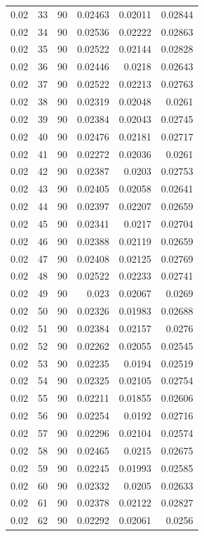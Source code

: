 \begin{tabular}{rrrrrr}
0.02 & 33 & 90 & 0.02463 & 0.02011 & 0.02844 \\
0.02 & 34 & 90 & 0.02536 & 0.02222 & 0.02863 \\
0.02 & 35 & 90 & 0.02522 & 0.02144 & 0.02828 \\
0.02 & 36 & 90 & 0.02446 & 0.0218 & 0.02643 \\
0.02 & 37 & 90 & 0.02522 & 0.02213 & 0.02763 \\
0.02 & 38 & 90 & 0.02319 & 0.02048 & 0.0261 \\
0.02 & 39 & 90 & 0.02384 & 0.02043 & 0.02745 \\
0.02 & 40 & 90 & 0.02476 & 0.02181 & 0.02717 \\
0.02 & 41 & 90 & 0.02272 & 0.02036 & 0.0261 \\
0.02 & 42 & 90 & 0.02387 & 0.0203 & 0.02753 \\
0.02 & 43 & 90 & 0.02405 & 0.02058 & 0.02641 \\
0.02 & 44 & 90 & 0.02397 & 0.02207 & 0.02659 \\
0.02 & 45 & 90 & 0.02341 & 0.0217 & 0.02704 \\
0.02 & 46 & 90 & 0.02388 & 0.02119 & 0.02659 \\
0.02 & 47 & 90 & 0.02408 & 0.02125 & 0.02769 \\
0.02 & 48 & 90 & 0.02522 & 0.02233 & 0.02741 \\
0.02 & 49 & 90 & 0.023 & 0.02067 & 0.0269 \\
0.02 & 50 & 90 & 0.02326 & 0.01983 & 0.02688 \\
0.02 & 51 & 90 & 0.02384 & 0.02157 & 0.0276 \\
0.02 & 52 & 90 & 0.02262 & 0.02055 & 0.02545 \\
0.02 & 53 & 90 & 0.02235 & 0.0194 & 0.02519 \\
0.02 & 54 & 90 & 0.02325 & 0.02105 & 0.02754 \\
0.02 & 55 & 90 & 0.02211 & 0.01855 & 0.02606 \\
0.02 & 56 & 90 & 0.02254 & 0.0192 & 0.02716 \\
0.02 & 57 & 90 & 0.02296 & 0.02104 & 0.02574 \\
0.02 & 58 & 90 & 0.02465 & 0.0215 & 0.02675 \\
0.02 & 59 & 90 & 0.02245 & 0.01993 & 0.02585 \\
0.02 & 60 & 90 & 0.02332 & 0.0205 & 0.02633 \\
0.02 & 61 & 90 & 0.02378 & 0.02122 & 0.02827 \\
0.02 & 62 & 90 & 0.02292 & 0.02061 & 0.0256 \\

\end{tabular}
